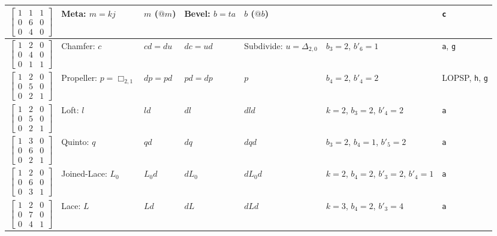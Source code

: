 \documentclass[12pt]{amsart}%
\begin{document}
\begin{longtable}{c|m{2cm}|m{2cm}|m{2cm}|m{2cm}|m{1.7cm}|m{2.5cm}}
    \\ \hline
    $\begin{bmatrix}
    1 & 1 & 1 \\
    0 & 6 & 0 \\
    0 & 4 & 0 \end{bmatrix}$& Meta: ${m=kj}$ & $m$ ($@m$) & Bevel: ${b=ta}$ & $b$ ($@b$) & &\texttt{c}
    \\ \hline
    $\begin{bmatrix}
    1 & 2 & 0 \\
    0 & 4 & 0 \\
    0 & 1 & 1 \end{bmatrix}$& Chamfer: $c$ & $cd=du$ & $dc=ud$ & Subdivide: ${u =\Delta_{2,0}}$ & ${b_3=2}$, ${b'_6=1}$ &\texttt{a}, \texttt{g}
    \\ \hline
    $\begin{bmatrix}
    1 & 2 & 0 \\
    0 & 5 & 0 \\
    0 & 2 & 1 \end{bmatrix}$& Propeller: ${p=\Box_{2,1}}$ & $dp=pd$ & $pd=dp$ & $p$ & ${b_4=2}$, ${b'_4=2}$ &LOPSP, \texttt{h}, \texttt{g}
    \\ \hline
    $\begin{bmatrix}
    1 & 2 & 0 \\
    0 & 5 & 0 \\
    0 & 2 & 1 \end{bmatrix}$& Loft: $l$ & $ld$ & $dl$ & $dld$ & ${k=2}$, ${b_3=2}$, ${b'_4=2}$ &\texttt{a}
    \\ \hline
    $\begin{bmatrix}
    1 & 3 & 0 \\
    0 & 6 & 0 \\
    0 & 2 & 1 \end{bmatrix}$& Quinto: $q$ & $qd$ & $dq$ & $dqd$ & ${b_3=2}$, ${b_4=1}$, ${b'_5=2}$ &\texttt{a}
    \\ \hline
    $\begin{bmatrix}
    1 & 2 & 0 \\
    0 & 6 & 0 \\
    0 & 3 & 1 \end{bmatrix}$& Joined-Lace: $L_0$ & $L_0d$ & $dL_0$ & $dL_0d$
    & ${k=2}$, ${b_4=2}$, ${b'_3=2}$, ${b'_4=1}$ &\texttt{a}
    \\ \hline
    $\begin{bmatrix}
    1 & 2 & 0 \\
    0 & 7 & 0 \\
    0 & 4 & 1 \end{bmatrix}$& Lace: $L$ & $Ld$ & $dL$ & $dLd$ & ${k=3}$, ${b_4=2}$, ${b'_3=4}$&\texttt{a}

\end{longtable}
\end{document}
